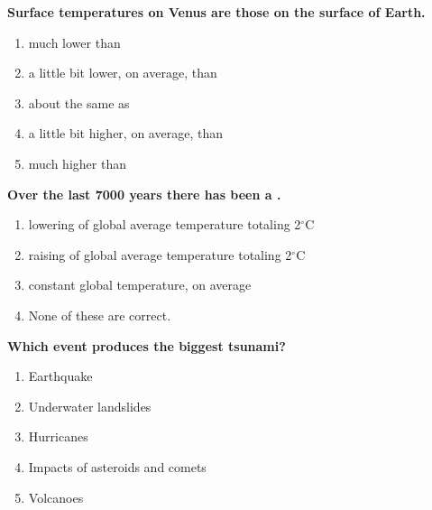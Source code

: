 \item {
\setlength{\itemsep}{0cm}
\setlength{\parskip}{.2cm}
\begin{samepage}
\textbf{
Surface temperatures on Venus are \makebox[1cm]{\Rivpt\hrulefill\Rivpt} those on the surface of Earth.
}
\begin{enumerate}
\item {  much lower than }
\item {  a little bit lower, on average, than }
\item {  about the same as }
\item {  a little bit higher, on average, than }
\item {  much higher than }
\end{enumerate}
\end{samepage}
}
\item {
\setlength{\itemsep}{0cm}
\setlength{\parskip}{.2cm}
\begin{samepage}
\textbf{
Over the last 7000 years there has been a \makebox[1cm]{\Rivpt\hrulefill\Rivpt}.
}
\begin{enumerate}
\item {  lowering of global average temperature totaling 2\ensuremath{^\circ}C }
\item {  raising of global average temperature totaling 2\ensuremath{^\circ}C }
\item {  constant global temperature, on average  }
\item {  None of these are correct. }
\end{enumerate}
\end{samepage}
}
\item {
\setlength{\itemsep}{0cm}
\setlength{\parskip}{.2cm}
\begin{samepage}
\textbf{
Which event produces the biggest tsunami?
}
\begin{enumerate}
\item { 	Earthquake }
\item { 	Underwater landslides }
\item { 	Hurricanes }
\item { 	Impacts of asteroids and comets }
\item { 	Volcanoes 		 }
\end{enumerate}
\end{samepage}
}
